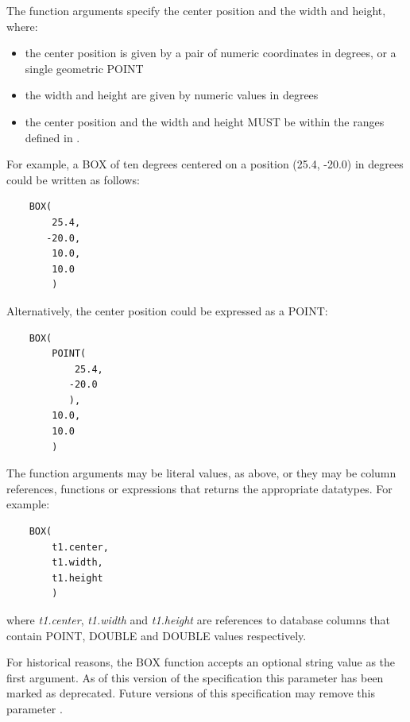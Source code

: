 \documentclass[11pt,a4paper]{ivoa}
\begin{document}

The function arguments specify the center position and the width and height,
where:
\begin{itemize}
    \item the center position is given by a pair of numeric coordinates
    in degrees, or a single geometric POINT
    \item the width and height are given by numeric values in degrees
    \item the center position and the width and height MUST be within the ranges defined in
    .
\end{itemize}

For example, a BOX of ten degrees centered on a position
(25.4, -20.0) in degrees could be written as follows:
\begin{verbatim}
    BOX(
        25.4,
       -20.0,
        10.0,
        10.0
        )
\end{verbatim}

Alternatively, the center position could be expressed as a POINT:
\begin{verbatim}
    BOX(
        POINT(
            25.4,
           -20.0
           ),
        10.0,
        10.0
        )
\end{verbatim}

The function arguments may be literal values, as above, or they may be
column references, functions or expressions that returns the appropriate
datatypes.
For example:
\begin{verbatim}
    BOX(
        t1.center,
        t1.width,
        t1.height
        )
\end{verbatim}
where \textit{t1.center}, \textit{t1.width} and \textit{t1.height}
are references to database columns that contain POINT, DOUBLE
and DOUBLE values respectively.

For historical reasons, the BOX function accepts an optional string
value as the first argument.
As of this version of the specification this parameter has been
marked as deprecated.
Future versions of this specification may remove this parameter
.
\end{document}
